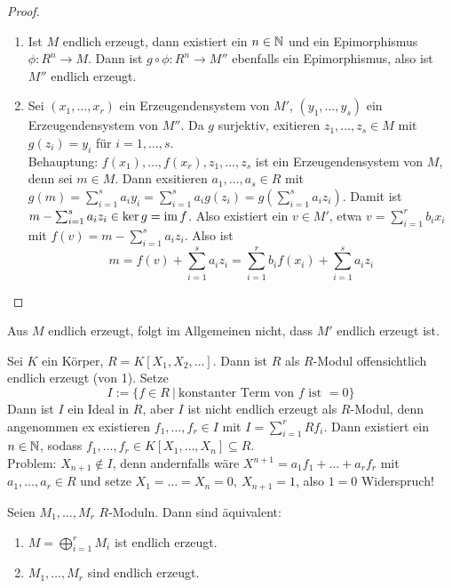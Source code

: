 \begin{proof}
	\begin{enumerate}[label=\alph*)]
		\item Ist $M$ endlich erzeugt, dann existiert ein $n\in \mathbb{N}$ und ein Epimorphismus $\phi:R^n \to M$. Dann ist $g\circ \phi:R^n \to M''$ ebenfalls ein Epimorphismus, also ist $M''$ endlich erzeugt.
		\item Sei $(x_1, \ldots, x_r)$ ein Erzeugendensystem von $M'$, $(y_1, \ldots, y_s)$ ein Erzeugendensystem von $M''$. Da $g$ surjektiv, exitieren $z_1, \ldots, z_s\in M$ mit $g(z_i) = y_i$ für $i=1, \ldots, s$. \\
		Behauptung: $f(x_1), \ldots, f(x_r), z_1, \ldots, z_s$ ist ein Erzeugendensystem von $M$, denn sei $m\in M$. Dann exsitieren $a_1, \ldots, a_s\in R$ mit $g(m) = \sum_{i=1}^s a_i y_i = \sum_{i=1}^s a_i g(z_i) = g(\sum_{i=1}^s a_i z_i)$. Damit ist $m- \sum_{i=1}^s a_i z_i \in \ker g = \operatorname{im} f$. Also existiert ein $v\in M'$, etwa $v= \sum_{i=1}^r b_i x_i$ mit $f(v) = m - \sum_{i=1}^s a_i z_i $. Also ist 
		$$m=f(v) + \sum_{i=1}^sa_i z_i = \sum_{i=1}^r b_i f(x_i) + \sum_{i=1}^s a_i z_i$$ 
	\end{enumerate}
\end{proof}
\begin{anm}
	Aus $M$ endlich erzeugt, folgt im Allgemeinen nicht, dass $M'$ endlich erzeugt ist.
\end{anm}
\begin{bsp}\label{2.6}
	Sei $K$ ein Körper, $R=K[X_1, X_2, \ldots]$. Dann ist $R$ als $R$-Modul offensichtlich endlich erzeugt (von 1). Setze $$I:= \{f\in R \ | \ \text{konstanter Term von } f \text{ ist } =0\}$$
	Dann ist $I$ ein Ideal in $R$, aber $I$ ist nicht endlich erzeugt als $R$-Modul, denn angenommen ex existieren $f_1, \ldots, f_r\in I$ mit $I = \sum_{i=1}^rRf_i$. Dann existiert ein $n\in \mathbb{N}$, sodass $f_1, \ldots, f_r\in K[X_1, \ldots, X_n] \subseteq R$. \\
	Problem: $X_{n+1} \notin I$, denn andernfalls wäre $X^{n+1} = a_1 f_1 + \ldots + a_rf_r$ mit $a_1, \ldots, a_r \in R$ und setze $X_1 = \ldots = X_n = 0, \ X_{n+1} = 1$, also $1=0$ Widerspruch!		
\end{bsp}
\begin{bem}\label{2.7}
	Seien $M_1, \ldots, M_r$ $R$-Moduln. Dann sind äquivalent:
	\begin{enumerate}[label=\roman*)]
		\item $M= \bigoplus_{i=1}^r M_i$ ist endlich erzeugt.
		\item $M_1, \ldots, M_r$ sind endlich erzeugt.
	\end{enumerate}
\end{bem}
